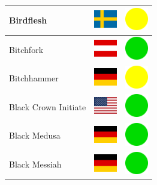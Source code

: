 \documentclass[12pt, a4paper, twoside]{report}
\begin{document}
\begin{center}
\begin{longtable}{|p{5cm}|p{2cm}|p{2cm}|}
 Birdflesh                                                  & \includegraphics[width=1cm]{../img/flags/se} &   \includegraphics[width=1cm]{../likes/m} \\ \hline
 Bitchfork                                                  & \includegraphics[width=1cm]{../img/flags/at} &   \includegraphics[width=1cm]{../likes/y} \\ \hline
 Bitchhammer                                                & \includegraphics[width=1cm]{../img/flags/de} &   \includegraphics[width=1cm]{../likes/m} \\ \hline
 Black Crown Initiate                                       & \includegraphics[width=1cm]{../img/flags/us} &   \includegraphics[width=1cm]{../likes/y} \\ \hline
 Black Medusa                                               & \includegraphics[width=1cm]{../img/flags/de} &   \includegraphics[width=1cm]{../likes/y} \\ \hline
 Black Messiah                                              & \includegraphics[width=1cm]{../img/flags/de} &   \includegraphics[width=1cm]{../likes/y} \\ \hline

\end{longtable}
\end{center}
\end{document}
